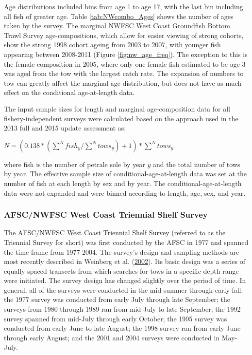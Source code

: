 \documentclass[12pt,]{article}
\begin{document}
Age distributions included bins from age 1 to age 17, with the last bin
including all fish of greater age. Table \ref{tab:NWcombo_Ages} shows
the number of ages taken by the survey. The marginal NWFSC West Coast
Groundfish Bottom Trawl Survey age-compositions, which allow for easier
viewing of strong cohorts, show the strong 1998 cohort ageing from 2003
to 2007, with younger fish appearing between 2008-2011 (Figure
\ref{fig:nw_age_freq}). The exception to this is the female composition
in 2005, where only one female fish estimated to be age 3 was aged from
the tow with the largest catch rate. The expansion of numbers to tow can
greatly affect the marginal age distribution, but does not have as much
effect on the conditional age-at-length data.

The input sample sizes for length and marginal age-composition data for
all fishery-independent surveys were calculated based on the approach
used in the 2013 full and 2015 update assessment as:

\begin{centering}

$N = (0.138*(\sum_{}^{N} fish_{y} / \sum_{}^N tows_{y}) + 1)*\sum_{}^N tows_y$ 

\end{centering}

where fish is the number of petrale sole by year \(y\) and the total
number of tows by year. The effective sample size of
conditional-age-at-length data was set at the number of fish at each
length by sex and by year. The conditional-age-at-length data were not
expanded and were binned according to length, age, sex, and year.

\subsubsection{AFSC/NWFSC West Coast Triennial Shelf
Survey}\label{afscnwfsc-west-coast-triennial-shelf-survey}

The AFSC/NWFSC West Coast Triennial Shelf Survey (referred to as the
Triennial Survey for short) was first conducted by the AFSC in 1977 and
spanned the time-frame from 1977-2004. The survey's design and sampling
methods are most recently described in Weinberg et al.
(\protect\hyperlink{ref-weinberg_2001_2002}{2002}). Its basic design was
a series of equally-spaced transects from which searches for tows in a
specific depth range were initiated. The survey design has changed
slightly over the period of time. In general, all of the surveys were
conducted in the mid-summer through early fall: the 1977 survey was
conducted from early July through late September; the surveys from 1980
through 1989 ran from mid-July to late September; the 1992 survey
spanned from mid-July through early October; the 1995 survey was
conducted from early June to late August; the 1998 survey ran from early
June through early August; and the 2001 and 2004 surveys were conducted
in May-July.
\end{document}
